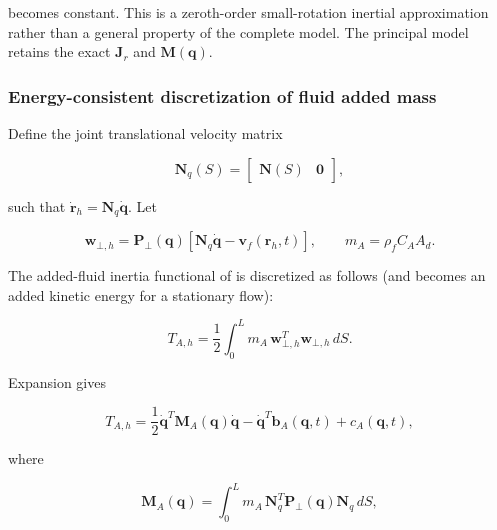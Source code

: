 becomes constant. This is a zeroth-order small-rotation inertial approximation rather than a general property of the complete model. The principal model retains the exact \(\mathbf{J}_{r}\) and \(\mathbf{M}\left( \mathbf{q} \right)\).

\subsubsection{Energy-consistent discretization of fluid added mass}\label{sec:galerkin-2-4-6}

Define the joint translational velocity matrix

\begin{equation}
\label{eq:galerkin-2-53}
\mathbf{N}_{q}(S) = \begin{bmatrix}
\mathbf{N}(S) & \mathbf{0}
\end{bmatrix},
\end{equation}

such that \({\dot{\mathbf{r}}}_{h} = \mathbf{N}_{q}\dot{\mathbf{q}}\). Let

\begin{equation}
\label{eq:galerkin-2-54}
\mathbf{w}_{\bot,h} = \mathbf{P}_{\bot}\left( \mathbf{q} \right)\left\lbrack \mathbf{N}_{q}\dot{\mathbf{q}} - \mathbf{v}_{f}\left( \mathbf{r}_{h},t \right) \right\rbrack,\quad\quad m_{A} = \rho_{f}C_{A}A_{d}.
\end{equation}

The added-fluid inertia functional of  is discretized as follows (and becomes an added kinetic energy for a stationary flow):

\begin{equation}
\label{eq:galerkin-2-55}
\boxed{T_{A,h} = \frac{1}{2}\int_{0}^{L}m_{A}\,\mathbf{w}_{\bot,h}^{T}\mathbf{w}_{\bot,h}\, dS.}
\end{equation}

Expansion gives

\begin{equation}
\label{eq:galerkin-2-56}
T_{A,h} = \frac{1}{2}{\dot{\mathbf{q}}}^{T}\mathbf{M}_{A}\left( \mathbf{q} \right)\dot{\mathbf{q}} - {\dot{\mathbf{q}}}^{T}\mathbf{b}_{A}\left( \mathbf{q},t \right) + c_{A}\left( \mathbf{q},t \right),
\end{equation}

where

\begin{equation}
\label{eq:galerkin-2-57}
\boxed{\mathbf{M}_{A}\left( \mathbf{q} \right) = \int_{0}^{L}m_{A}\,\mathbf{N}_{q}^{T}\mathbf{P}_{\bot}\left( \mathbf{q} \right)\mathbf{N}_{q}\, dS,}
\end{equation}


